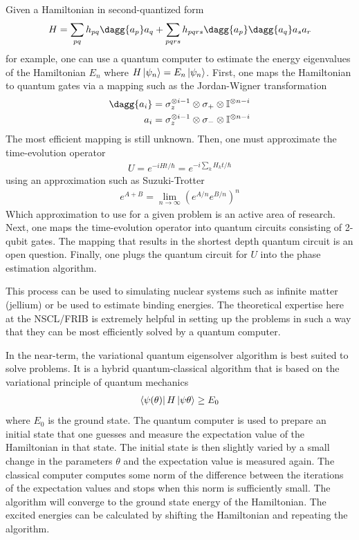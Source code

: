 \documentclass[10pt]{article}
\begin{document}
Given a Hamiltonian in second-quantized form
\begin{align*}
H=\sum_{pq}h_{pq}\dagg{a_p}a_q+\sum_{pqrs}h_{pqrs}\dagg{a_p}\dagg{a_q}a_sa_r
\end{align*}
for example, one can use a quantum computer to estimate the energy eigenvalues of the Hamiltonian $E_n$ where $H\ket{\psi_n}=E_n\ket{\psi_n}$. First, one maps the Hamiltonian to quantum gates via a mapping such as the Jordan-Wigner transformation
\begin{align*}
\dagg{a_i}&=\sigma_z^{\otimes i-1}\otimes\sigma_+\otimes\mathbb{I}^{\otimes n-i} \\
\nonumber
a_i&=\sigma_z^{\otimes i-1}\otimes\sigma_-\otimes\mathbb{I}^{\otimes n-i}
\end{align*}
The most efficient mapping is still unknown.
Then, one must approximate the time-evolution operator
\begin{align*}
U=e^{-iHt/\hbar}=e^{-i\sum_kH_kt/\hbar}
\end{align*}
using an approximation such as Suzuki-Trotter
\begin{align*}
e^{A+B}=\lim_{n\to\infty}\left(e^{A/n}e^{B/n}\right)^n
\end{align*}
Which approximation to use for a given problem is an active area of research.
Next, one maps the time-evolution operator into quantum circuits consisting of 2-qubit gates. The mapping that results in the shortest depth quantum circuit is an open question. Finally, one plugs the quantum circuit for $U$ into the phase estimation algorithm.

This process can be used to simulating nuclear systems such as infinite matter (jellium) or be used to estimate binding energies. The theoretical expertise here at the NSCL/FRIB is extremely helpful in setting up the problems in such a way that they can be most efficiently solved by a quantum computer.

In the near-term, the variational quantum eigensolver algorithm is best suited to solve problems. It is a hybrid quantum-classical algorithm that is based on the variational principle of quantum mechanics
\begin{align*}
\bra{\psi(\theta)}H\ket{\psi{\theta}}\geq E_0
\end{align*}
where $E_0$ is the ground state. The quantum computer is used to prepare an initial state that one guesses and measure the expectation value of the Hamiltonian in that state. The initial state is then slightly varied by a small change in the parameters $\theta$ and the expectation value is measured again. The classical computer computes some norm of the difference between the iterations of the expectation values and stops when this norm is sufficiently small. The algorithm will converge to the ground state energy of the Hamiltonian. The excited energies can be calculated by shifting the Hamiltonian and repeating the algorithm.
\end{document}
